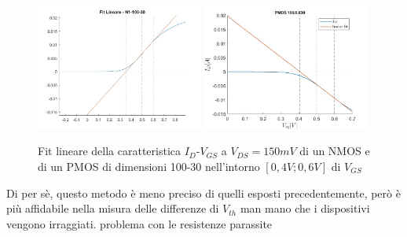 \documentclass[12pt, letterpaper]{book}
\begin{document}
\begin{figure}[h!]
\centering
 \includegraphics[width=0.49\textwidth]{LinearFit-N1-100-30}
 \includegraphics[width=0.49\textwidth]{LinearFit-P1-100-30}
 \caption{Fit lineare della caratteristica  $I_D$-$V_{GS}$ a $V_{DS}=150mV$ di un NMOS e di un PMOS di dimensioni 100-30 nell'intorno $[0,4V ; 0,6V]$ di $V_{GS}$}
\end{figure}

Di per sè, questo metodo è meno preciso di quelli esposti precedentemente, però è più affidabile nella misura delle differenze di $V_{th}$ man mano che i dispositivi vengono irraggiati. problema con le resistenze parassite
\end{document}
